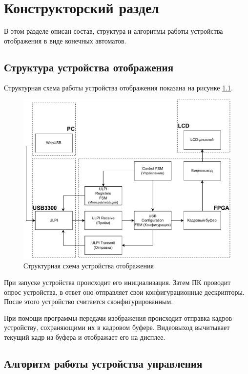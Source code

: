 \chapter{Конструкторский раздел}
\label{cha:design}

В этом разделе описан состав, структура и алгоритмы работы устройства отображения в виде конечных автоматов.

\section{Структура устройства отображения}

Структурная схема работы устройства отображения показана на рисунке \ref{fig:structure}.

\begin{figure}[ht]
    \centering
    \includegraphics[scale=0.7]{res/img/structure.pdf}
    \caption{Структурная схема устройства отображения}
    \label{fig:structure}
\end{figure}

При запуске устройства происходит его инициализация. Затем ПК проводит опрос устройства, в ответ оно отправляет свои конфигурационные дескрипторы. После этого устройство считается сконфигурированным.

При помощи программы передачи изображения происходит отправка кадров устройству, сохраняющими их в кадровом буфере. Видеовыход вычитывает текущий кадр из буфера и отображает его на дисплее.

\section{Алгоритм работы устройства управления}


